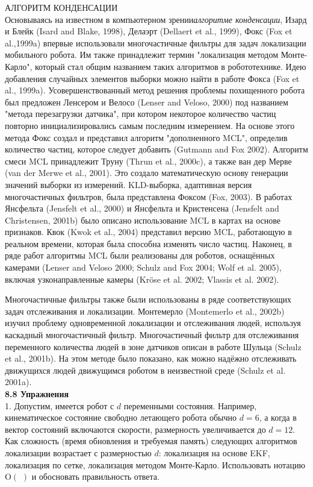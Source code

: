 \documentclass[10pt,a4paper]{article}
\begin{document}
АЛГОРИТМ КОНДЕНСАЦИИ\\

Основываясь на известном в компьютерном зрении\textit{алгоритме конденсации}, Изард и Блейк (Isard and Blake, 1998), Делаэрт (Dellaert et al., 1999), Фокс (Fox et al.,1999a) впервые использовали многочастичные фильтры для задач локализации мобильного робота. Им также принадлежит термин "локализация методом Монте-Карло", который стал общим названием таких алгоритмов в робототехнике. Идею добавления случайных элементов выборки можно найти в работе Фокса (Fox et al., 1999a). Усовершенствованный метод решения проблемы похищенного робота был предложен Ленсером и Велосо (Lenser and Veloso, 2000) под названием "метода перезагрузки датчика", при котором некоторое количество частиц повторно инициализировались самым последним измерением.
 На основе этого метода Фокс создал и представил алгоритм "дополненного MCL", определив количество частиц, которое следует добавить (Gutmann and Fox 2002). Алгоритм смеси MCL принадлежит Труну (Thrun et al., 2000c), а также ван дер Мерве (van der Merwe et al., 2001).
Это создало математическую основу генерации значений выборки из измерений. KLD-выборка, адаптивная версия многочастичных фильтров, была представлена Фоксом (Fox, 2003). В работах Янсфельта (Jensfelt et al., 2000) и Янсфельта и Кристенсена (Jensfelt and Christensen, 2001b) было описано использование MCL в картах на основе признаков. Квок (Kwok et al., 2004) представил версию MCL, работающую в реальном времени, которая была способна изменять число частиц. Наконец, в ряде работ алгоритмы MCL были реализованы для роботов, оснащённых камерами (Lenser and Veloso 2000; Schulz and Fox 2004; Wolf et al. 2005), включая узконаправленные камеры (Kröse et al. 2002; Vlassis et al. 2002).

Многочастичные фильтры также были использованы в ряде соответствующих задач отслеживания и локализации.
Монтемерло (Montemerlo et al., 2002b) изучил проблему одновременной локализации и отслеживания людей, используя каскадный многочастичный фильтр. Многочастичный фильтр для отслеживания переменного количества людей в зоне датчиков описан в работе Шульца 
(Schulz et al., 2001b). На этом методе было показано, как можно надёжно отслеживать движущихся людей движущимся роботом в неизвестной среде (Schulz et al. 2001a).\\

\textbf{8.8 Упражнения}\\

1. Допустим, имеется робот с $d$ переменными состояния. Например, кинематическое состояние свободно летающего робота обычно
$d = 6$, а когда в вектор состояний включаются скорости, размерность увеличивается до $d = 12$. Как сложность (время обновления и требуемая память) следующих алгоритмов локализации возрастает с размерностью $d$: локализация на основе EKF, локализация по сетке, локализация методом Монте-Карло. Использовать нотацию O$(\,\,)$ и обосновать правильность ответа.\\
\end{document}
